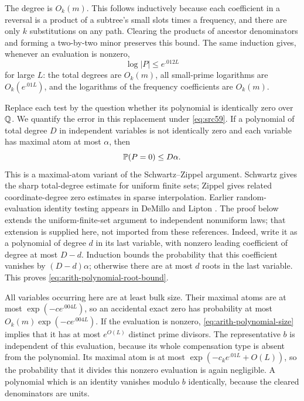 The degree is $O_k(m)$. This follows inductively because each coefficient in
a reversal is a product of a subtree's small slots times a frequency, and
there are only $k$ substitutions on any path. Clearing the products of
ancestor denominators and forming a two-by-two minor preserves this bound.
The same induction gives, whenever an evaluation is nonzero,
\begin{equation}\label{eq:arith-polynomial-size}
                               \log|P|\leq e^{.012L}
\end{equation}
for large $L$: the total degrees are $O_k(m)$, all small-prime logarithms
are $O_k(e^{.01L})$, and the logarithms of the frequency coefficients are
$O_k(m)$.

Replace each test by the question whether its polynomial is identically
zero over $\mathbb Q$. We quantify the error in this replacement under
\eqref{eq:src59}. If a polynomial of total degree $D$ in independent
variables is not identically zero and each variable has maximal atom at
most $\alpha$, then
\begin{equation}\label{eq:arith-polynomial-root-bound}
                             \mathbb P(P=0)\leq D\alpha.
\end{equation}
This is a maximal-atom variant of the Schwartz--Zippel argument.
Schwartz \cite[Lemma~1, p.~702]{Schwartz1980} gives the sharp total-degree
estimate for uniform finite sets; Zippel
\cite[\S 3.1, Theorem~1]{Zippel1979} gives related coordinate-degree
zero estimates in sparse interpolation.  Earlier random-evaluation
identity testing appears in DeMillo and Lipton \cite{DeMilloLipton1978}.
The proof below extends the uniform-finite-set argument to independent
nonuniform laws; that extension is supplied here, not imported from these
references.
Indeed, write it as a polynomial of degree $d$ in its last variable, with
nonzero leading coefficient of degree at most $D-d$. Induction bounds the
probability that this coefficient vanishes by $(D-d)\alpha$; otherwise
there are at most $d$ roots in the last variable. This proves
\eqref{eq:arith-polynomial-root-bound}.

All variables occurring here are at least bulk size. Their maximal atoms
are at most $\exp(-c e^{.004L})$, so an accidental exact zero has probability
at most $O_k(m)\exp(-c e^{.004L})$. If the evaluation is nonzero,
\eqref{eq:arith-polynomial-size} implies that it has at most $e^{O(L)}$
distinct prime divisors. The representative $b$ is independent of this
evaluation, because its whole compensation type is absent from the
polynomial. Its maximal atom is at most
$\exp(-c_k e^{.01L}+O(L))$, so the probability that it divides this
nonzero evaluation is again negligible. A polynomial which is an identity
vanishes modulo $b$ identically, because the cleared denominators are units.

